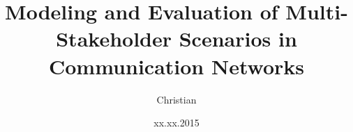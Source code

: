 \documentclass[pdf]{diss}
\date{xx.xx.2015}
\author{Christian}{Schwartz}
\title{Modeling and Evaluation of Multi-Stakeholder Scenarios in Communication Networks}
\begin{document}
\setcounter{tocdepth}{4} 

\clearpage

\cite*{TranGia2005}











\end{document}
